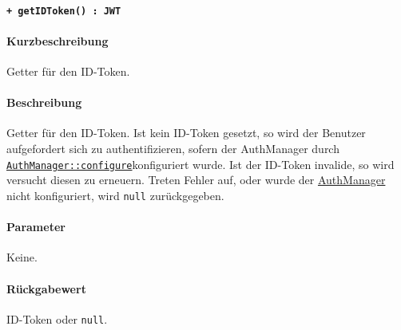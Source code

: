 \paragraph{\texttt{+ getIDToken() : JWT}}\label{AP_AuthManager_getIDToken}%
\paragraph*{Kurzbeschreibung}
Getter für den ID-Token.
\paragraph*{Beschreibung}
Getter für den ID-Token.
Ist kein ID-Token gesetzt, so wird der Benutzer aufgefordert sich zu authentifizieren, sofern der AuthManager durch \hyperref[AP_AuthManager_configure]{\texttt{AuthManager::configure}}konfiguriert wurde.
Ist der ID-Token invalide, so wird versucht diesen zu erneuern.
Treten Fehler auf, oder wurde der \hyperref[AP_AuthManager]{AuthManager} nicht konfiguriert, wird \verb#null# zurückgegeben.
\paragraph*{Parameter}
Keine.
\paragraph*{Rückgabewert}
ID-Token oder \verb#null#.